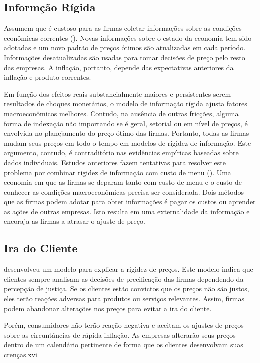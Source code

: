 \documentclass[twoside,a4paper,11pt]{report}
\begin{document}
\subsection*{Informção Rígida}

Assumem que é custoso para as firmas coletar informações sobre as condições econômicas correntes (\citet{mankiw2001sticky}). Novas informações sobre o estado da economia tem sido adotadas e um novo padrão de preços ótimos são atualizadas em cada período. Informações desatualizadas são usadas para tomar decisões de preço pelo resto das empresas. A inflação, portanto, depende das expectativas anteriores da inflação e produto correntes.

Em função dos efeitos reais substancialmente maiores e persistentes serem resultados de choques monetários, o modelo de informação rígida ajusta fatores macroeconômicos melhores. Contudo, na ausência de outras fricções, alguma forma de indexação não importando se é geral, setorial ou em nível de preços, é envolvida no planejamento do preço ótimo das firmas. Portanto, todas as firmas mudam seus preços em todo o tempo em modelos de rigidez de informação. Este argumento, contudo, é contraditório nas evidências empíricas baseadas sobre dados individuais. Estudos anteriores fazem tentativas para resolver este problema por combinar rigidez de informação com custo de menu (\citet{klenow2007sticky,ii2010tale}). Uma economia em que as firmas se deparam tanto com custo de menu e o custo de conhecer as condições macroeconômicas precisa ser considerada. Dois métodos que as firmas podem adotar para obter informações é pagar os custos ou aprender as ações de outras empresas. Isto resulta em uma externalidade da informação e encoraja as firmas a atrasar o ajuste de preço.

\subsection*{Ira do Cliente}

\citet{rotemberg2005customer} desenvolveu um modelo para explicar a rigidez de preços. Este modelo indica que clientes sempre analisam as decisões de precificação das firmas dependendo da percepção de justiça. Se os clientes estão convictos que os preços não são justos, eles terão reações adversas para produtos ou serviços relevantes. Assim, firmas podem abandonar alterações nos preços para evitar a ira do cliente. 

Porém, consumidores não terão reação negativa e aceitam os ajustes de preços sobre as circuntâncias de rápida inflação. As empresas alterarão seus preços dentro de um calendário pertinente de forma que os clientes desenvolvam suas crenças.xvi 
\end{document}
